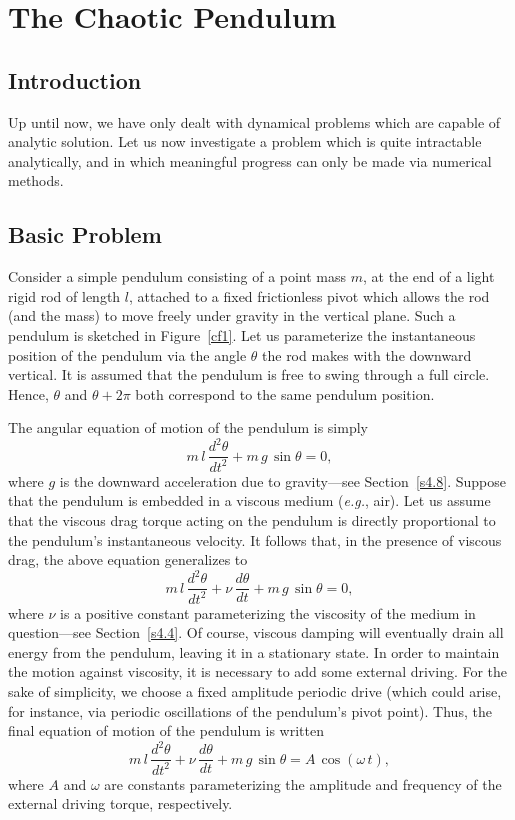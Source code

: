 \chapter{The Chaotic Pendulum}\label{schaos}
\section{Introduction}
Up until now, we have only dealt with dynamical problems which are capable of analytic solution. Let us now investigate a problem
which is quite intractable analytically, and  in which meaningful progress can only be
made via numerical methods.

\section{Basic Problem}
Consider a simple pendulum consisting of a point mass $m$, at the end of a light
rigid rod of length $l$, attached to a fixed frictionless pivot
which allows the rod (and the mass) to move freely under gravity in the vertical plane. Such a
pendulum is sketched in Figure~\ref{cf1}. Let us parameterize the instantaneous position
of the pendulum via the angle $\theta$ the rod makes with the downward vertical. It is
assumed that the pendulum is free to swing through a full circle. Hence, $\theta$ and $\theta +2\pi$
both correspond to the same pendulum position.

The angular equation of motion of the pendulum is simply
\begin{equation}
m\,l\,\frac{d^2\theta}{dt^2} + m\,g\,\sin\theta = 0,
\end{equation}
where $g$ is the downward acceleration due to gravity---see Section~\ref{s4.8}. 
Suppose that the pendulum is embedded in  a viscous medium ({\em e.g.}, air). 
Let us assume that the viscous drag torque acting on the pendulum is
directly proportional to the pendulum's instantaneous velocity.
 It follows that, in the presence of viscous drag, the above
equation generalizes to
\begin{equation}
m\,l\,\frac{d^2\theta}{dt^2}+ \nu\,\frac{d\theta}{dt} + m\,g\,\sin\theta = 0,
\end{equation}
where $\nu$ is a positive constant parameterizing the viscosity of the medium
in question---see Section~\ref{s4.4}. Of course, viscous
damping will eventually drain all energy from the pendulum, leaving it in a stationary state. 
In order to maintain the motion against viscosity, it is necessary to add some external driving.
For the sake of simplicity, we choose a fixed amplitude periodic drive (which could arise, for
instance, via periodic oscillations of the pendulum's pivot point). Thus, the final equation
of motion of the pendulum is written
\begin{equation}\label{e16.3}
m\,l\,\frac{d^2\theta}{dt^2}+ \nu\,\frac{d\theta}{dt} + m\,g\,\sin\theta =  A\,\cos(\omega\, t),
\end{equation}
where $A$ and $\omega$ are  constants parameterizing the amplitude
and  frequency  of the external driving torque, respectively.

